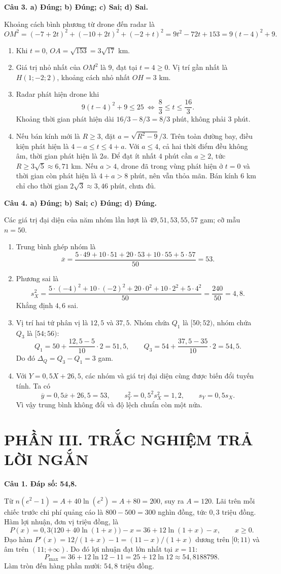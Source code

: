 \documentclass[12pt,a4paper]{article}
\newcommand{\loigiai}[1]{\par\medskip\Needspace{4\baselineskip}\noindent\textbf{#1}\par\nobreak}
\begin{document}
\loigiai{Câu 3. a) Đúng; b) Đúng; c) Sai; d) Sai.}
Khoảng cách bình phương từ drone đến radar là
\[
OM^2=(-7+2t)^2+(-10+2t)^2+(-2+t)^2
=9t^2-72t+153=9(t-4)^2+9.
\]
\begin{enumerate}[label=\alph*),leftmargin=*]
\item Khi $t=0$, $OA=\sqrt{153}=3\sqrt{17}$ km.
\item Giá trị nhỏ nhất của $OM^2$ là $9$, đạt tại $t=4\geq0$. Vị trí gần nhất là $H(1;-2;2)$, khoảng cách nhỏ nhất $OH=3$ km.
\item Radar phát hiện drone khi
\[
9(t-4)^2+9\leq25
\ \Longleftrightarrow\ \frac83\leq t\leq\frac{16}3.
\]
Khoảng thời gian phát hiện dài $16/3-8/3=8/3$ phút, không phải $3$ phút.
\item Nếu bán kính mới là $R\geq3$, đặt $a=\sqrt{R^2-9}/3$. Trên toàn đường bay, điều kiện phát hiện là $4-a\leq t\leq4+a$. Với $a\leq4$, cả hai thời điểm đều không âm, thời gian phát hiện là $2a$. Để đạt ít nhất $4$ phút cần $a\geq2$, tức $R\geq3\sqrt5\approx6{,}71$ km. Nếu $a>4$, drone đã trong vùng phát hiện ở $t=0$ và thời gian còn phát hiện là $4+a>8$ phút, nên vẫn thỏa mãn. Bán kính $6$ km chỉ cho thời gian $2\sqrt3\approx3{,}46$ phút, chưa đủ.
\end{enumerate}

\loigiai{Câu 4. a) Đúng; b) Sai; c) Đúng; d) Đúng.}
Các giá trị đại diện của năm nhóm lần lượt là $49,51,53,55,57$ gam; cỡ mẫu $n=50$.
\begin{enumerate}[label=\alph*),leftmargin=*]
\item Trung bình ghép nhóm là
\[
\overline x=\frac{5\cdot49+10\cdot51+20\cdot53+10\cdot55+5\cdot57}{50}=53.
\]
\item Phương sai là
\[
s_X^2=\frac{5\cdot(-4)^2+10\cdot(-2)^2+20\cdot0^2+10\cdot2^2+5\cdot4^2}{50}
=\frac{240}{50}=4{,}8.
\]
Khẳng định $4{,}6$ sai.
\item Vị trí hai tứ phân vị là $12{,}5$ và $37{,}5$. Nhóm chứa $Q_1$ là $[50;52)$, nhóm chứa $Q_3$ là $[54;56)$:
\[
Q_1=50+\frac{12{,}5-5}{10}\cdot2=51{,}5,\qquad
Q_3=54+\frac{37{,}5-35}{10}\cdot2=54{,}5.
\]
Do đó $\Delta_Q=Q_3-Q_1=3$ gam.
\item Với $Y=0{,}5X+26{,}5$, các nhóm và giá trị đại diện cùng được biến đổi tuyến tính. Ta có
\[
\overline y=0{,}5\overline x+26{,}5=53,\qquad
s_Y^2=0{,}5^2s_X^2=1{,}2,\qquad s_Y=0{,}5s_X.
\]
Vì vậy trung bình không đổi và độ lệch chuẩn còn một nửa.
\end{enumerate}

\section*{\large PHẦN III. TRẮC NGHIỆM TRẢ LỜI NGẮN}
\loigiai{Câu 1. Đáp số: 54,8.}
Từ $n(e^2-1)=A+40\ln(e^2)=A+80=200$, suy ra $A=120$.
Lãi trên mỗi chiếc trước chi phí quảng cáo là $800-500=300$ nghìn đồng, tức $0{,}3$ triệu đồng. Hàm lợi nhuận, đơn vị triệu đồng, là
\[
P(x)=0{,}3\big(120+40\ln(1+x)\big)-x
=36+12\ln(1+x)-x,\qquad x\geq0.
\]
Đạo hàm $P'(x)=12/(1+x)-1=(11-x)/(1+x)$ dương trên $[0;11)$ và âm trên $(11;+\infty)$. Do đó lợi nhuận đạt lớn nhất tại $x=11$:
\[
P_{\max}=36+12\ln12-11=25+12\ln12\approx54{,}8188798.
\]
Làm tròn đến hàng phần mười: $54{,}8$ triệu đồng.
\end{document}
